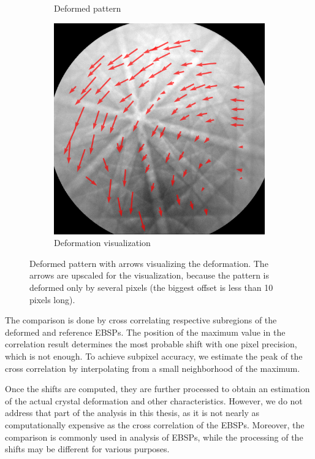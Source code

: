 \begin{figure}
\begin{subfigure}{.4\textwidth}
		\caption{Deformed pattern}
		\label{fig:sub2}
	\end{subfigure}
	\centering
	\begin{subfigure}{.4\textwidth}
		\centering
		\includegraphics[width=.9\linewidth]{img/roi_shifts}
		\caption{Deformation visualization}
		\label{fig:sub2}
	\end{subfigure}

	\caption{Deformed pattern with arrows visualizing the deformation. The arrows are upscaled for the visualization, because the pattern is deformed only by several pixels (the biggest offset is less than 10 pixels long).}
	\label{roi-shifts}
\end{figure}

The comparison is done by cross correlating respective subregions of the deformed and reference EBSPs. The position of the maximum value in the correlation result determines the most probable shift with one pixel precision, which is not enough. To achieve subpixel accuracy, we estimate the peak of the cross correlation by interpolating from a small neighborhood of the maximum.

Once the shifts are computed, they are further processed to obtain an estimation of the actual crystal deformation and other characteristics. However, we do not address that part of the analysis in this thesis, as it is not nearly as computationally expensive as the cross correlation of the EBSPs. Moreover, the comparison is commonly used in analysis of EBSPs, while the processing of the shifts may be different for various purposes.

